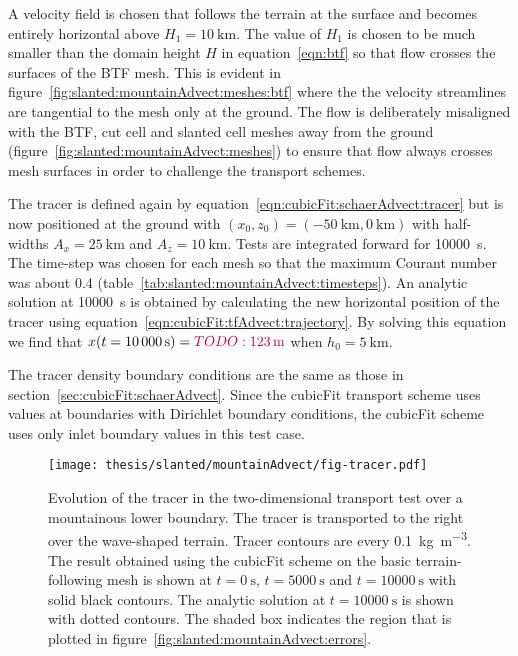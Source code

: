 A velocity field is chosen that follows the terrain at the surface and becomes entirely horizontal above $H_1 = \SI{10}{\kilo\meter}$.
The value of $H_1$ is chosen to be much smaller than the domain height $H$ in equation~\eqref{eqn:btf} so that flow crosses the surfaces of the BTF mesh.
This is evident in figure~\ref{fig:slanted:mountainAdvect:meshes:btf} where the the velocity streamlines are tangential to the mesh only at the ground.
The flow is deliberately misaligned with the BTF, cut cell and slanted cell meshes away from the ground (figure~\ref{fig:slanted:mountainAdvect:meshes}) to ensure that flow always crosses mesh surfaces in order to challenge the transport schemes.

\begin{table}
	\centering
	
%
	\caption{Time-steps (\si{\second}) for the two-dimensional transport test over a mountainous lower boundary.  The time-steps were chosen so that the maximum Courant number was between \num{0.36} and \num{0.46}.}
	\label{tab:slanted:mountainAdvect:timesteps}
\end{table}

The tracer is defined again by equation~\eqref{eqn:cubicFit:schaerAdvect:tracer} but is now positioned at the ground with $(x_0, z_0) = (\SI{-50}{\kilo\meter}, \SI{0}{\kilo\meter})$ with half-widths $A_x = \SI{25}{\kilo\meter}$ and $A_z = \SI{10}{\kilo\meter}$.
Tests are integrated forward for \SI{10000}{\second}.  The time-step was chosen for each mesh so that the maximum Courant number was about \num{0.4} (table~\ref{tab:slanted:mountainAdvect:timesteps}).
An analytic solution at \SI{10000}{\second} is obtained by calculating the new horizontal position of the tracer using equation~\eqref{eqn:cubicFit:tfAdvect:trajectory}.
By solving this equation we find that \(x(t=\SI{10000}{\second}) = \textcolor{purple}{TODO: \emph{\SI{123}{\meter}}}\) when $h_0 = \SI{5}{\kilo\meter}$.

The tracer density boundary conditions are the same as those in section~\ref{sec:cubicFit:schaerAdvect}.
Since the cubicFit transport scheme uses values at boundaries with Dirichlet boundary conditions, the cubicFit scheme uses only inlet boundary values in this test case.

\begin{figure}
	\centering
	\texttt{[image: thesis/slanted/mountainAdvect/fig-tracer.pdf]}
	\caption{Evolution of the tracer in the two-dimensional transport test over a mountainous lower boundary.  The tracer is transported to the right over the wave-shaped terrain.  Tracer contours are every \SI{0.1}{\kilo\gram\per\meter\cubed}.  The result obtained using the cubicFit scheme on the basic terrain-following mesh is shown at $t=\SI{0}{\second}$, $t=\SI{5000}{\second}$ and $t=\SI{10000}{\second}$ with solid black contours. The analytic solution at $t=\SI{10000}{\second}$ is shown with dotted contours.
	The shaded box indicates the region that is plotted in figure~\ref{fig:slanted:mountainAdvect:errors}.}
	\label{fig:slanted:mountainAdvect:tracer}
\end{figure}

